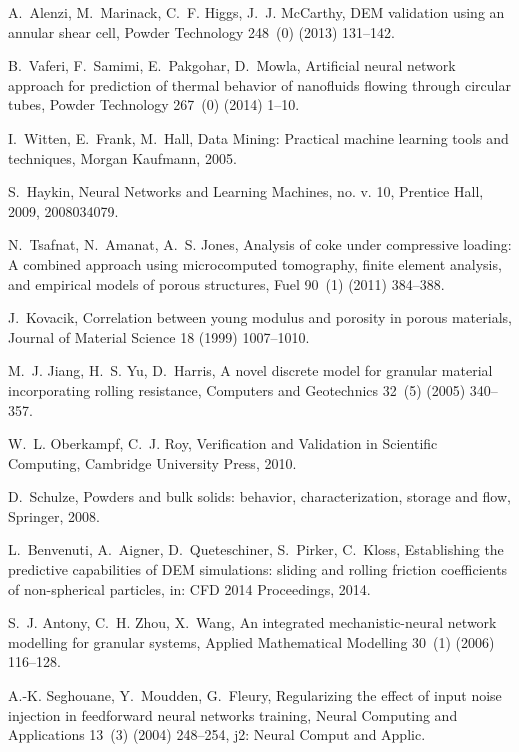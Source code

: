 \documentclass[review]{elsarticle}
\begin{document}
\begin{thebibliography}{10}
A.~Alenzi, M.~Marinack, C.~F. Higgs, J.~J. McCarthy, DEM validation using an
  annular shear cell, Powder Technology 248~(0) (2013) 131--142.

B.~Vaferi, F.~Samimi, E.~Pakgohar, D.~Mowla, Artificial neural network approach
  for prediction of thermal behavior of nanofluids flowing through circular
  tubes, Powder Technology 267~(0) (2014) 1--10.

I.~Witten, E.~Frank, M.~Hall, Data Mining: Practical machine learning tools and
  techniques, Morgan Kaufmann, 2005.

S.~Haykin, Neural Networks and Learning Machines, no. v. 10, Prentice Hall,
  2009, 2008034079.

N.~Tsafnat, N.~Amanat, A.~S. Jones, Analysis of coke under compressive loading:
  A combined approach using microcomputed tomography, finite element analysis,
  and empirical models of porous structures, Fuel 90~(1) (2011) 384--388.

J.~Kovacik, Correlation between young modulus and porosity in porous materials,
  Journal of Material Science 18 (1999) 1007--1010.

M.~J. Jiang, H.~S. Yu, D.~Harris, A novel discrete model for granular material
  incorporating rolling resistance, Computers and Geotechnics 32~(5) (2005)
  340--357.

W.~L. Oberkampf, C.~J. Roy, Verification and Validation in Scientific
  Computing, Cambridge University Press, 2010.

D.~Schulze, Powders and bulk solids: behavior, characterization, storage and
  flow, Springer, 2008.

L.~Benvenuti, A.~Aigner, D.~Queteschiner, S.~Pirker, C.~Kloss, Establishing the
  predictive capabilities of DEM simulations: sliding and rolling friction
  coefficients of non-spherical particles, in: CFD 2014 Proceedings, 2014.

S.~J. Antony, C.~H. Zhou, X.~Wang, An integrated mechanistic-neural network
  modelling for granular systems, Applied Mathematical Modelling 30~(1) (2006)
  116--128.

A.-K. Seghouane, Y.~Moudden, G.~Fleury, Regularizing the effect of input noise
  injection in feedforward neural networks training, Neural Computing and
  Applications 13~(3) (2004) 248--254, j2: Neural Comput and Applic.


\end{thebibliography}
\end{document}
